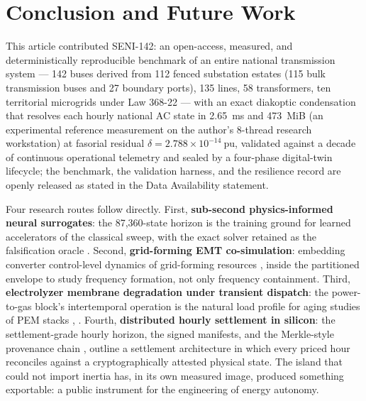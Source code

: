 \section{Conclusion and Future Work}
\label{sec:conclusion}

This article contributed SENI-142: an open-access, measured, and deterministically reproducible benchmark of an entire national transmission system --- 142 buses derived from 112 fenced substation estates (115 bulk transmission buses and 27 boundary ports), 135 lines, 58 transformers, ten territorial microgrids under Law 368-22 --- with an exact diakoptic condensation that resolves each hourly national AC state in 2.65~ms and 473~MiB (an experimental reference measurement on the author's 8-thread research workstation) at fasorial residual $\delta = 2.788 \times 10^{-14}\ \mathrm{pu}$, validated against a decade of continuous operational telemetry and sealed by a four-phase digital-twin lifecycle; the benchmark, the validation harness, and the resilience record are openly released as stated in the Data Availability statement.

Four research routes follow directly. First, \textbf{sub-second physics-informed neural surrogates}: the 87,360-state horizon is the training ground for learned accelerators of the classical sweep, with the exact solver retained as the falsification oracle \cite{misyris2020}. Second, \textbf{grid-forming EMT co-simulation}: embedding converter control-level dynamics of grid-forming resources \cite{rosso2021}, \cite{ieee2800} inside the partitioned envelope to study frequency formation, not only frequency containment. Third, \textbf{electrolyzer membrane degradation under transient dispatch}: the power-to-gas block's intertemporal operation is the natural load profile for aging studies of PEM stacks \cite{irena2020}, \cite{iea2023}. Fourth, \textbf{distributed hourly settlement in silicon}: the settlement-grade hourly horizon, the signed manifests, and the Merkle-style provenance chain \cite{merkle1987}, \cite{fips180} outline a settlement architecture in which every priced hour reconciles against a cryptographically attested physical state. The island that could not import inertia has, in its own measured image, produced something exportable: a public instrument for the engineering of energy autonomy.

